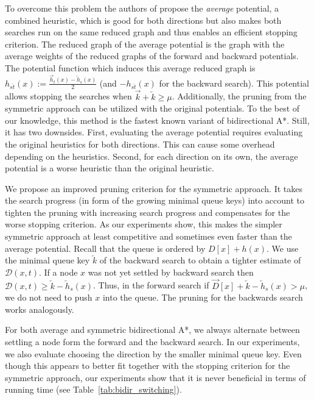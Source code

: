 \documentclass[manuscript,review]{acmart}
\newcommand*{\dist}{\mathcal{D}}
\begin{document}
To overcome this problem the authors of propose the \emph{average} potential, a combined heuristic, which is good for both directions but also makes both searches run on the same reduced graph and thus enables an efficient stopping criterion.
The reduced graph of the average potential is the graph with the average weights of the reduced graphs of the forward and backward potentials.
The potential function which induces this average reduced graph is $h_{\overline{st}}(x) := \frac{\overrightarrow{h}_t(x) - \overleftarrow{h}_s(x)}{2}$ (and $-h_{\overline{st}}(x)$ for the backward search).
This potential allows stopping the searches when $\overrightarrow{k} + \overleftarrow{k} \geq \mu$.
Additionally, the pruning from the symmetric approach can be utilized with the original potentials.
To the best of our knowledge, this method is the fastest known variant of bidirectional A*.
Still, it has two downsides.
First, evaluating the average potential requires evaluating the original heuristics for both directions.
This can cause some overhead depending on the heuristics.
Second, for each direction on its own, the average potential is a worse heuristic than the original heuristic.

We propose an improved pruning criterion for the symmetric approach.
It takes the search progress (in form of the growing minimal queue keys) into account to tighten the pruning with increasing search progress and compensates for the worse stopping criterion.
As our experiments show, this makes the simpler symmetric approach at least competitive and sometimes even faster than the average potential.
Recall that the queue is ordered by $D[x] + h(x)$.
We use the minimal queue key $\overleftarrow{k}$ of the backward search to obtain a tighter estimate of $\dist(x,t)$.
If a node $x$ was not yet settled by backward search then $\dist(x,t) \geq \overleftarrow{k} - \overleftarrow{h}_s(x)$.
Thus, in the forward search if $\overrightarrow{D}[x] + \overleftarrow{k} - \overleftarrow{h}_s(x) > \mu$, we do not need to push $x$ into the queue.
The pruning for the backwards search works analogously.

For both average and symmetric bidirectional A*, we always alternate between settling a node form the forward and the backward search.
In our experiments, we also evaluate choosing the direction by the smaller minimal queue key.
Even though this appears to better fit together with the stopping criterion for the symmetric approach, our experiments show that it is never beneficial in terms of running time (see Table~\ref{tab:bidir_switching}).
\end{document}
